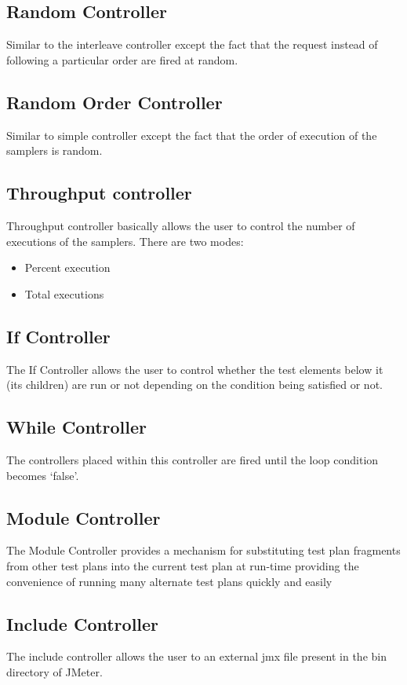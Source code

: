 \documentclass[12pt]{book}
\begin{document}
  \subsection{Random Controller}
  Similar to the interleave controller except the fact that the request instead of following a particular order are fired at random.
  
  \subsection{Random Order Controller}
  Similar to simple controller except the fact that the order of execution of the samplers is random.
  
  \subsection{Throughput controller}
  Throughput controller basically allows the user to control the number of executions of the samplers. There are two modes:
  \begin{itemize}
   \item Percent execution
   \item Total executions
  \end{itemize} 
  
  \subsection{If Controller}
  The If Controller allows the user to control whether the test elements below it (its children) are run or not depending on
  the condition being satisfied or not. 
  
  \subsection{While Controller}
    The controllers placed within this controller are fired until the loop condition becomes ‘false’.
  
  \subsection{Module Controller}
  The Module Controller provides a mechanism for substituting test plan fragments from other test plans  into the current test plan at 
  run-time providing the convenience of  running many alternate test plans quickly and easily
  
  \subsection{Include Controller}
  The include controller allows the user to  an external jmx file present in the bin directory of JMeter.
  
\end{document}
